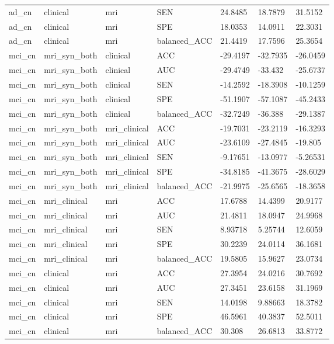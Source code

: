 \begin{landscape}
\begin{longtable}{lllllll}
ad\_cn & clinical & mri & SEN & 24.8485 & 18.7879 & 31.5152 \\
ad\_cn & clinical & mri & SPE & 18.0353 & 14.0911 & 22.3031 \\
ad\_cn & clinical & mri & balanced\_ACC & 21.4419 & 17.7596 & 25.3654 \\
mci\_cn & mri\_syn\_both & clinical & ACC & -29.4197 & -32.7935 & -26.0459 \\
mci\_cn & mri\_syn\_both & clinical & AUC & -29.4749 & -33.432 & -25.6737 \\
mci\_cn & mri\_syn\_both & clinical & SEN & -14.2592 & -18.3908 & -10.1259 \\
mci\_cn & mri\_syn\_both & clinical & SPE & -51.1907 & -57.1087 & -45.2433 \\
mci\_cn & mri\_syn\_both & clinical & balanced\_ACC & -32.7249 & -36.388 & -29.1387 \\
mci\_cn & mri\_syn\_both & mri\_clinical & ACC & -19.7031 & -23.2119 & -16.3293 \\
mci\_cn & mri\_syn\_both & mri\_clinical & AUC & -23.6109 & -27.4845 & -19.805 \\
mci\_cn & mri\_syn\_both & mri\_clinical & SEN & -9.17651 & -13.0977 & -5.26531 \\
mci\_cn & mri\_syn\_both & mri\_clinical & SPE & -34.8185 & -41.3675 & -28.6029 \\
mci\_cn & mri\_syn\_both & mri\_clinical & balanced\_ACC & -21.9975 & -25.6565 & -18.3658 \\
mci\_cn & mri\_clinical & mri & ACC & 17.6788 & 14.4399 & 20.9177 \\
mci\_cn & mri\_clinical & mri & AUC & 21.4811 & 18.0947 & 24.9968 \\
mci\_cn & mri\_clinical & mri & SEN & 8.93718 & 5.25744 & 12.6059 \\
mci\_cn & mri\_clinical & mri & SPE & 30.2239 & 24.0114 & 36.1681 \\
mci\_cn & mri\_clinical & mri & balanced\_ACC & 19.5805 & 15.9627 & 23.0734 \\
mci\_cn & clinical & mri & ACC & 27.3954 & 24.0216 & 30.7692 \\
mci\_cn & clinical & mri & AUC & 27.3451 & 23.6158 & 31.1969 \\
mci\_cn & clinical & mri & SEN & 14.0198 & 9.88663 & 18.3782 \\
mci\_cn & clinical & mri & SPE & 46.5961 & 40.3837 & 52.5011 \\
mci\_cn & clinical & mri & balanced\_ACC & 30.308 & 26.6813 & 33.8772 \\

\end{longtable}
\end{landscape}
